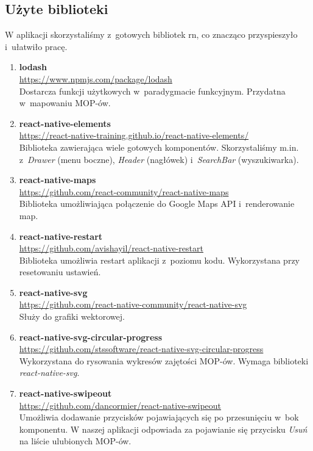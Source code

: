 \subsection{Użyte biblioteki}
W aplikacji skorzystaliśmy z~gotowych bibliotek \acrshort{rn}, co znacząco przyspieszyło i~ułatwiło pracę.
\begin{enumerate}
\item \textbf{lodash} \\
\url{https://www.npmjs.com/package/lodash}\\
Dostarcza funkcji użytkowych w~paradygmacie funkcyjnym. Przydatna w~mapowaniu MOP-ów.

\item \textbf{react-native-elements}\\
\url{https://react-native-training.github.io/react-native-elements/}\\ 
Biblioteka zawierająca wiele gotowych komponentów. Skorzystaliśmy m.in. z~\textit{Drawer} (menu boczne), \textit{Header} (nagłówek) i~\textit{SearchBar} (wyszukiwarka).

\item \textbf{react-native-maps} \\
\url{https://github.com/react-community/react-native-maps}\\
Biblioteka umożliwiająca połączenie do Google Maps API i~renderowanie map.

\item \textbf{react-native-restart} \\
\url{https://github.com/avishayil/react-native-restart}\\
Biblioteka umożliwia restart aplikacji z~poziomu kodu. Wykorzystana przy resetowaniu ustawień.

\item \textbf{react-native-svg} \\
\url{https://github.com/react-native-community/react-native-svg}\\
Służy do grafiki wektorowej.

\item \textbf{react-native-svg-circular-progress} \\
\url{https://github.com/stssoftware/react-native-svg-circular-progress}\\
Wykorzystana do rysowania wykresów zajętości MOP-ów. Wymaga biblioteki \textit{react-native-svg}.

\item \textbf{react-native-swipeout} \\
\url{https://github.com/dancormier/react-native-swipeout}\\
Umożliwia dodawanie przycisków pojawiających się po przesunięciu w~bok komponentu. W naszej aplikacji odpowiada za pojawianie się przycisku \textit{Usuń} na liście ulubionych MOP-ów.


\end{enumerate}

